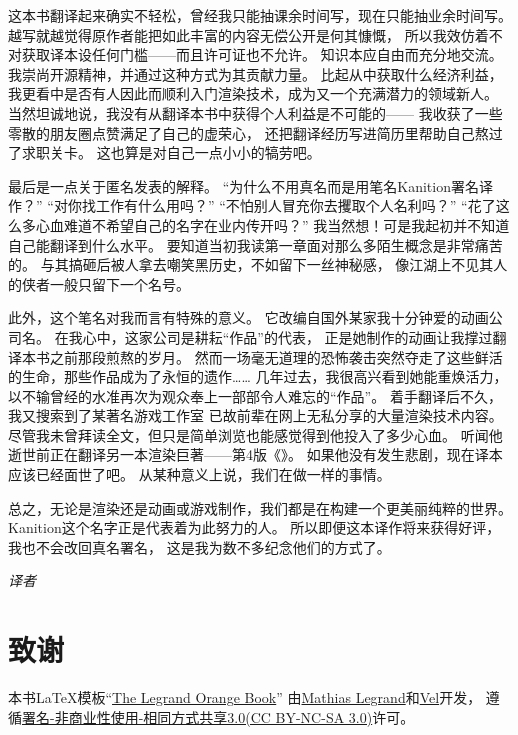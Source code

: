 这本书翻译起来确实不轻松，曾经我只能抽课余时间写，现在只能抽业余时间写。
越写就越觉得原作者能把如此丰富的内容无偿公开是何其慷慨，
所以我效仿着不对获取译本设任何门槛——而且许可证也不允许。
知识本应自由而充分地交流。我崇尚开源精神，并通过这种方式为其贡献力量。
比起从中获取什么经济利益，我更看中是否有人因此而顺利入门渲染技术，成为又一个充满潜力的领域新人。
当然坦诚地说，我没有从翻译本书中获得个人利益是不可能的——
我收获了一些零散的朋友圈点赞满足了自己的虚荣心，
还把翻译经历写进简历里帮助自己熬过了求职关卡。
这也算是对自己一点小小的犒劳吧。

最后是一点关于匿名发表的解释。
“为什么不用真名而是用笔名Kanition署名译作？”
“对你找工作有什么用吗？”
“不怕别人冒充你去攫取个人名利吗？”
“花了这么多心血难道不希望自己的名字在业内传开吗？”
我当然想！可是我起初并不知道自己能翻译到什么水平。
要知道当初我读第一章面对那么多陌生概念是非常痛苦的。
与其搞砸后被人拿去嘲笑黑历史，不如留下一丝神秘感，
像江湖上不见其人的侠者一般只留下一个名号。

此外，这个笔名对我而言有特殊的意义。
它改编自国外某家我十分钟爱的动画公司名。
在我心中，这家公司是耕耘“作品”的代表，
正是她制作的动画让我撑过翻译本书之前那段煎熬的岁月。
然而一场毫无道理的恐怖袭击突然夺走了这些鲜活的生命，那些作品成为了永恒的遗作……
几年过去，我很高兴看到她能重焕活力，以不输曾经的水准再次为观众奉上一部部令人难忘的“作品”。
着手翻译后不久，我又搜索到了某著名游戏工作室
已故前辈{\href{https://github.com/QianMo}{\textcolor{black}{}}}在网上无私分享的大量渲染技术内容。
尽管我未曾拜读全文，但只是简单浏览也能感觉得到他投入了多少心血。
听闻他逝世前正在翻译另一本渲染巨著——第4版《》。
如果他没有发生悲剧，现在译本应该已经面世了吧。
从某种意义上说，我们在做一样的事情。

总之，无论是渲染还是动画或游戏制作，我们都是在构建一个更美丽纯粹的世界。
Kanition这个名字正是代表着为此努力的人。
所以即便这本译作将来获得好评，我也不会改回真名署名，
这是我为数不多纪念他们的方式了。

\vspace{15pt}
{\hfill {\itshape 译者}\quad{}\qquad}

\section*{致谢}\label{sec:致谢b}
本书\LaTeX 模板“\href{https://www.latextemplates.com/template/legrand-orange-book}{The Legrand Orange Book}”
由\href{mailto:legrand.mathias@gmail.com}{Mathias Legrand}和\href{mailto:vel@latextemplates.com}{Vel}开发，
遵循\href{https://creativecommons.org/licenses/by-nc-sa/3.0/}{署名-非商业性使用-相同方式共享3.0(CC BY-NC-SA 3.0)}许可。

